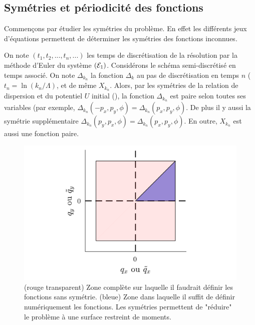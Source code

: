 \documentclass[10.5pt]{article}
\begin{document}
\begin{multicols}{2}
\subsection{Symétries et périodicité des fonctions}


Commençons par étudier les symétries du problème. En effet les différents jeux d'équations permettent de déterminer les symétries des fonctions inconnues.



On note $(t_1, t_2, ..., t_n, ...)$ les temps de discrétisation de la résolution par la méthode d'Euler du système $(\mathcal{E}_1)$. Considérons le schéma semi-discrétisé en temps associé. On note $\Delta_{k_n}$ la fonction $\Delta_k$ au pas de discrétisation en temps $n$ ($t_n = \ln(k_n/\Lambda)$, et de même $X_{k_n}$. Alors, par les symétries de la relation de dispersion et du potentiel $U$ initial (), la fonction $\Delta_{k_n}$ est paire selon toutes ses variables (par exemple, $\Delta_{k_n}(-p_x, p_y, \phi) = \Delta_{k_n}(p_x, p_y, \phi)$. De plus il y aussi la symétrie supplémentaire $\Delta_{k_n}(p_y, p_x, \phi) = \Delta_{k_n} (p_x, p_y, \phi)$. En outre, $X_{k_n}$ est aussi une fonction paire. 

\begin{figure}[H]
\begin{center}
	\includegraphics[width=0.95\columnwidth]{SurfUtile.pdf}
\end{center}
\vspace*{-22pt}
\caption{(rouge transparent) Zone complète sur laquelle il faudrait définir les fonctions sans symétrie. (bleue) Zone dans laquelle il suffit de définir numériquement les fonctions. Les symétries permettent de "réduire" le problème à une surface restreint de moments.}
\label{fig:SurfUtile}
\end{figure}



\end{multicols}
\end{document}
